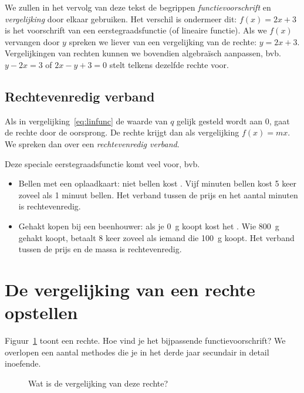 We zullen in het vervolg van deze tekst de begrippen \emph{functievoorschrift} en \emph{vergelijking} door elkaar gebruiken. Het verschil is ondermeer dit: $f(x)=2x+3$ is het voorschrift van een eerstegraadsfunctie (of lineaire functie). Als we $f(x)$ vervangen door $y$ spreken we liever van een vergelijking van de rechte: $y=2x+3$. Vergelijkingen van rechten kunnen we bovendien algebraïsch aanpassen, bvb. $y-2x=3$ of $2x-y+3=0$ stelt telkens dezelfde rechte voor.

\subsection{Rechtevenredig verband}
Als in vergelijking~\eqref{eq:linfunc} de waarde van $q$ gelijk gesteld wordt aan 0, gaat de rechte door de oorsprong. De rechte krijgt dan als vergelijking $f(x)=mx$. We spreken dan over een \emph{rechtevenredig verband}.

Deze speciale eerstegraadsfunctie komt veel voor, bvb. 
\begin{itemize}
\item Bellen met een oplaadkaart: niet bellen kost . Vijf minuten bellen kost 5 keer zoveel als 1 minuut bellen. Het verband tussen de prijs en het aantal minuten is rechtevenredig.
\item Gehakt kopen bij een beenhouwer: als je \SI{0}{\gram} koopt kost het . Wie \SI{800}{\gram} gehakt koopt, betaalt 8 keer zoveel als iemand die \SI{100}{\gram} koopt.  Het verband tussen de prijs en de massa is rechtevenredig.
\end{itemize}

\section{De vergelijking van een rechte opstellen}
Figuur~\ref{fig:rechtevgl} toont een rechte. Hoe vind je het bijpassende functievoorschrift? We overlopen een aantal methodes die je in het derde jaar secundair in detail inoefende.
\begin{figure}[htbp]
    \centering
{}
\caption{Wat is de vergelijking van deze rechte?}
    \label{fig:rechtevgl}
\end{figure}

